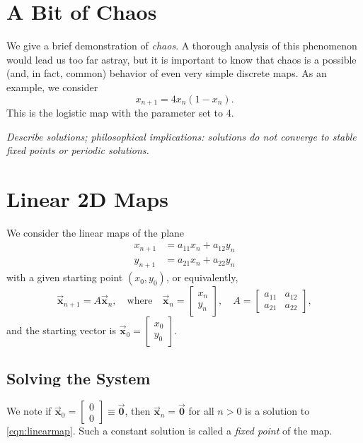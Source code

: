 \documentclass[reqno]{immbook}
\newcommand{\BX}{\vec{\textbf{x}}}
\newcommand{\BZero}{\vec{\textbf{0}}}  %
\newcommand{\ds}{\displaystyle}
\numberwithin{equation}{chapter}
\numberwithin{question}{section}
\numberwithin{theorem}{chapter}
\numberwithin{figure}{chapter}
\theoremstyle{definition}
\begin{document}
%
\section{A Bit of Chaos}
We give a brief demonstration of \emph{chaos}.
A thorough analysis of this phenomenon would lead us too far
astray, but it is important to know that chaos is a possible
(and, in fact, common) behavior of even very simple
discrete maps.
As an example, we consider
\begin{equation}
   x_{n+1} = 4x_n(1-x_n).
\end{equation}
This is the logistic map with the parameter set to 4.

\emph{Describe solutions; philosophical implications: solutions
do not converge to stable fixed points or periodic solutions.}
%
%

\newpage
\section{Linear 2D Maps}

We consider the linear maps of the plane
\begin{equation}
\begin{split}
  x_{n+1} & = a_{11}x_n + a_{12}y_n \\
  y_{n+1} & = a_{21}x_n + a_{22}y_n
\end{split}
\end{equation}
with a given starting point $(x_0,y_0)$,
or equivalently,
\begin{equation}
  \BX_{n+1} = A\BX_n, \quad \textrm{where} \quad
     \BX_n = \begin{bmatrix} x_n \\ y_n \end{bmatrix},
     \quad
     A = \begin{bmatrix} a_{11} & a_{12} \\ a_{21} & a_{22} \end{bmatrix},
\label{eqn:linearmap}
\end{equation}
and the starting vector is
$\ds \BX_0 = \begin{bmatrix} x_0 \\ y_0 \end{bmatrix}$.
%
%
\subsection*{Solving the System}
We note if $\BX_0 = \begin{bmatrix}0 \\ 0\end{bmatrix} \equiv \BZero$, then $\BX_n = \BZero$ for all $n>0$ is a solution to \eqref{eqn:linearmap}.
Such a constant solution is called a \emph{fixed point}
of the map.
\end{document}
